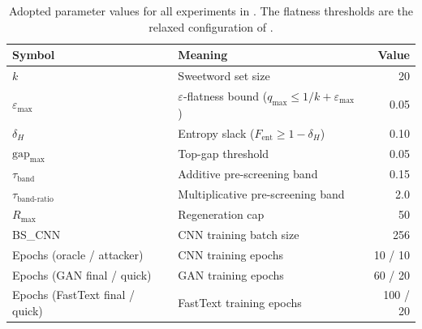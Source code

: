 \begin{table}[t]
  \centering
  \begin{tabular}{llr}
    \toprule
    \textbf{Symbol} & \textbf{Meaning} & \textbf{Value} \\
    \midrule
    $k$ & Sweetword set size & 20 \\
    $\varepsilon_{\max}$ & $\varepsilon$-flatness bound ($q_{\max}\le 1/k+\varepsilon_{\max}$) & 0.05 \\
    $\delta_{H}$ & Entropy slack ($F_{\text{ent}}\ge 1-\delta_H$) & 0.10 \\
    $\text{gap}_{\max}$ & Top-gap threshold & 0.05 \\
    $\tau_{\text{band}}$ & Additive pre-screening band & 0.15 \\
    $\tau_{\text{band-ratio}}$ & Multiplicative pre-screening band & 2.0 \\
    $R_{\max}$ & Regeneration cap & 50 \\
    BS\_CNN & CNN training batch size & 256 \\
    Epochs (oracle / attacker) & CNN training epochs & 10 / 10 \\
    Epochs (GAN final / quick) & GAN training epochs & 60 / 20 \\
    Epochs (FastText final / quick) & FastText training epochs & 100 / 20 \\
    \bottomrule
  \end{tabular}
  \caption{Adopted parameter values for all experiments in .
  The flatness thresholds are the relaxed configuration of
  .}
  \label{tab:params}
\end{table}
